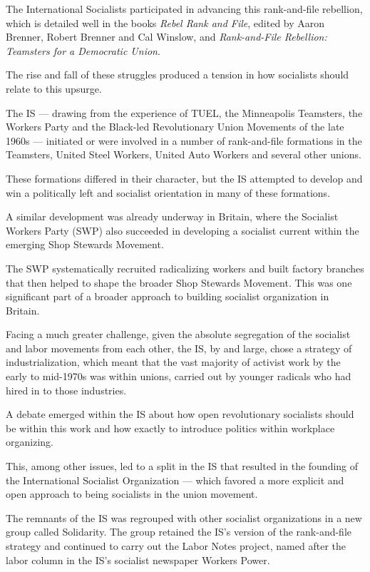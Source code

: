 The International Socialists participated in advancing this rank-and-file rebellion, which is detailed well in the books \emph{Rebel Rank and File}, edited by Aaron Brenner, Robert Brenner and Cal Winslow, and \emph{Rank-and-File Rebellion: Teamsters for a Democratic Union}.

\sectiondivider

The rise and fall of these struggles produced a tension in how socialists should relate to this upsurge.

The IS — drawing from the experience of TUEL, the Minneapolis Teamsters, the Workers Party and the Black-led Revolutionary Union Movements of the late 1960s — initiated or were involved in a number of rank-and-file formations in the Teamsters, United Steel Workers, United Auto Workers and several other unions.

These formations differed in their character, but the IS attempted to develop and win a politically left and socialist orientation in many of these formations.

A similar development was already underway in Britain, where the Socialist Workers Party (SWP) also succeeded in developing a socialist current within the emerging Shop Stewards Movement.

The SWP systematically recruited radicalizing workers and built factory branches that then helped to shape the broader Shop Stewards Movement. This was one significant part of a broader approach to building socialist organization in Britain.

Facing a much greater challenge, given the absolute segregation of the socialist and labor movements from each other, the IS, by and large, chose a strategy of industrialization, which meant that the vast majority of activist work by the early to mid-1970s was within unions, carried out by younger radicals who had hired in to those industries.

A debate emerged within the IS about how open revolutionary socialists should be within this work and how exactly to introduce politics within workplace organizing.

This, among other issues, led to a split in the IS that resulted in the founding of the International Socialist Organization — which favored a more explicit and open approach to being socialists in the union movement.

The remnants of the IS was regrouped with other socialist organizations in a new group called Solidarity. The group retained the IS’s version of the rank-and-file strategy and continued to carry out the Labor Notes project, named after the labor column in the IS’s socialist newspaper Workers Power.

